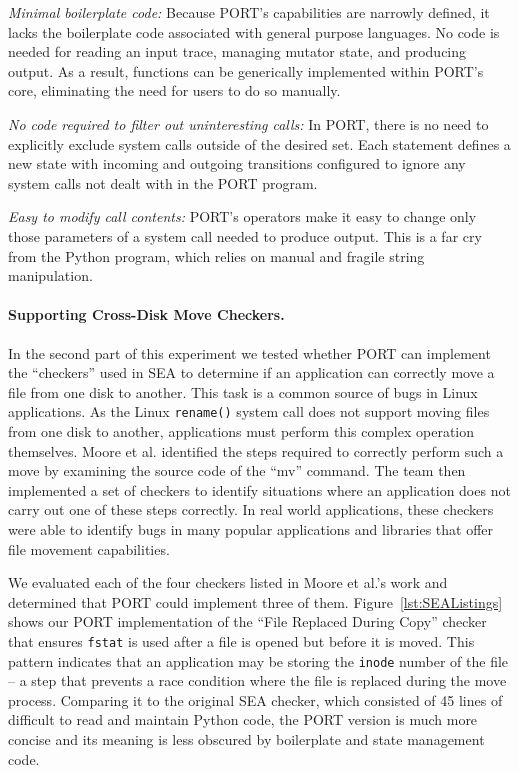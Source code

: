 \textit{Minimal boilerplate code:} Because PORT's capabilities are narrowly defined, it lacks the boilerplate
code associated with general purpose languages. No code is needed for
reading an input trace, managing mutator state, and producing output.
As a result,
functions can be generically implemented within PORT's core, eliminating
the need for users to do so manually.

\textit{No code required to filter out uninteresting calls:}
In PORT, there is no
need to explicitly exclude system
calls outside of the desired set.  Each statement defines a new state with
incoming and outgoing transitions configured to ignore any system calls not
dealt with in the PORT program.

\textit{Easy to modify call contents:}  PORT's operators make it
easy to change only those parameters  of a system call
 needed to produce output.
This is a far cry
from the Python program, which relies on manual and fragile string manipulation.

\paragraph{Supporting Cross-Disk Move Checkers.}

In the second part of this experiment we tested whether PORT can
implement the ``checkers'' used in SEA to determine if an
application can correctly move a file from one disk to another.
This task is a common source of bugs in Linux applications. As the
Linux
{\tt rename()} system call does not support moving files from one disk to
another,
applications must perform this complex
operation themselves.
Moore et al. identified the steps required to
correctly perform such a move by examining the source code of the ``mv''
command. The team then implemented a set of checkers to identify situations where an application does not carry out one
of these steps correctly.
In real world applications,
these checkers were able to identify bugs
in many popular applications and libraries that offer file movement
capabilities.

We evaluated each of the four checkers listed in Moore et al.'s work and
determined that PORT could implement three of them.
Figure~\ref{lst:SEAListings} shows our PORT implementation of
the ``File Replaced During Copy'' checker
that ensures {\tt fstat} is used after a file is opened but
before it is moved.  This pattern indicates that an application may be
storing the {\tt inode} number of the file -- a step that prevents a race
condition where the file is replaced during the move process.
Comparing it to the
original SEA checker,
which consisted of 45 lines of difficult to read and maintain Python code,
the PORT version is much more concise and its meaning is
less obscured by boilerplate and state management code.

